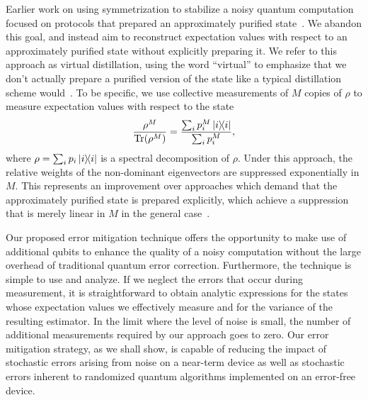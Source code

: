 \documentclass[
amsmath,
amssymb,
aps,
pra,
reprint,
twocolumn,
superscriptaddress,
longbibliography,
showkeys,
floatfix
]{revtex4-1}
\def\tr{\mathrm{Tr}}
\begin{document}
Earlier work on using symmetrization to stabilize a noisy quantum computation
focused on protocols that prepared an approximately purified
state~\cite{Berthiaume1994-ln, Barenco1997-do, Peres1999-rt}.
We abandon this goal, and instead aim to reconstruct expectation values
with respect to an approximately purified state without explicitly preparing it.
We refer to this approach as virtual distillation, using the word ``virtual'' to
emphasize that we don't actually prepare a purified version of the state like a
typical distillation scheme would~\cite{Bravyi2005-vi, Knill2005-vk,
  Haah2018-tg}.
To be specific, we use collective measurements of \(M\) copies of \(\rho\)
to measure expectation values with respect to the state
\begin{equation}
  \frac{\rho^M}{\tr(\rho^M)} = \frac{\sum_{i} p_i^M \ketbra{i}}{\sum_{i} p_i^M},
  \label{eq:first_rho_M_state}
\end{equation}
where \(\rho = \sum_i p_i \ketbra{i}\) is a spectral decomposition of \(\rho\).
Under this approach, the relative weights of the non-dominant eigenvectors are
suppressed exponentially in \(M\).
This represents an improvement over approaches which demand that the
approximately purified state is prepared explicitly, which achieve a suppression
that is merely linear in \(M\) in the general case~\cite{Berthiaume1994-ln, Barenco1997-do, Peres1999-rt, Cirac1999-ir}.

Our proposed error mitigation technique offers the opportunity to make use of
additional qubits to enhance the quality of a noisy computation without the
large overhead of traditional quantum error correction. 
Furthermore, the technique is simple to use and analyze. 
If we neglect the errors that occur during measurement, it is straightforward to
obtain analytic expressions for the states whose expectation values we
effectively measure and for the variance of the resulting estimator. 
In the limit where the level of noise is small, the number of additional
measurements required by our approach goes to zero. 
Our error mitigation strategy, as we shall show, is capable of reducing the
impact of stochastic errors arising from noise on a near-term device as well as
stochastic errors inherent to randomized quantum algorithms implemented on an
error-free device.
\end{document}
